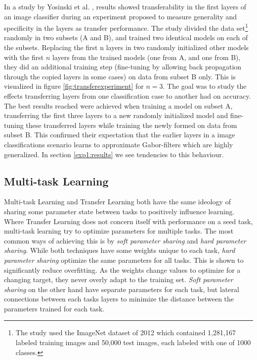 In a study by Yosinski et al. \cite{yosinski2014transferable}, results showed transferability in the first layers of an image classifier during an experiment proposed to measure generality and specificity in the layers as transfer performance. The study divided the data set\footnote{The study used the ImageNet dataset of 2012 which contained 1,281,167 labeled training images and 50,000 test images, each labeled with one of 1000 classes.} randomly in two subsets (A and B), and trained two identical models on each of the subsets. Replacing the first n layers in two randomly initialized other models with the first \(n\) layers from the trained models (one from A, and one from B), they did an additional training step (fine-tuning by allowing back propagation through the copied layers in some cases) on data from subset B only. This is visualized in figure \ref{fig:transferexperiment} for \(n=3\). The goal was to study the effects transferring layers from one classification case to another had on accuracy. The best results reached were achieved when training a model on subset A, transferring the first three layers to a new randomly initialized model and fine-tuning these transferred layers while training the newly formed on data from subset B. This confirmed their expectation that the earlier layers in a image classifications scenario learns to approximate Gabor-filters which are highly generalized. In section \ref{exp1:results} we see tendencies to this behaviour. 

\subsection{Multi-task Learning}
Multi-task Learning and Transfer Learning both have the same ideology of sharing some parameter state between tasks to positively influence learning. Where Transfer Learning does not concern itself with performance on a seed task, multi-task learning try to optimize parameters for multiple tasks. The most common ways of achieving this is by \textit{soft parameter sharing} and \textit{hard parameter sharing}. While both techniques have some weights unique to each task, \textit{hard parameter sharing} optimize the same parameters for all tasks. This is shown to significantly reduce overfitting\cite{hardparametersharing}. As the weights change values to optimize for a changing target, they never overly adapt to the training set. \textit{Soft parameter sharing} on the other hand have separate parameters for each task, but lateral connections between each tasks layers to minimize the distance between the parameters trained for each task.

